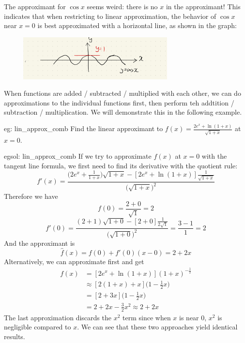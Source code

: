 \begin{remark}
    The approximant for $\cos x$ seems weird: there is no $x$ in the approximant!  This indicates that when restricting to linear approximation, the behavior of $\cos x$ near $x=0$ is best approximated with a horizontal line, as shown in the graph:
\end{remark}

\begin{figure}[ht]
    \centering
    \includegraphics[width = 0.7\textwidth]{figures/chap 05/lin_approx_cos.png}
    \label{fig: lin_approx_cos}
\end{figure}

When functions are added / subtracted / multiplied with each other, we can do approximations to the individual functions first, then perform teh addtition / subtraction / multiplication.  We will demonstrate this in the following example.

\begin{eg}[]{eg: lin_approx_comb}
    Find the linear approximant to $f(x) = \frac{2e^x + \ln(1+x)}{\sqrt{1+x}}$ at $x = 0$.
\end{eg}

\begin{egsol}[]{egsol: lin_approx_comb}
    If we try to approximate $f(x)$ at $x=0$ with the tangent line formula, we first need to find its derivative with the quotient rule:
    \[f'(x) = \frac{\big(2e^x + \frac{1}{1+x}\big)\sqrt{1+x} - [2e^x + \ln(1+x)]\frac{1}{\sqrt{1+x}}}{\big(\sqrt{1+x}\big)^2}\]
    Therefore we have
    \[f(0) = \frac{2+0}{\sqrt{1}} = 2\]
    \[f'(0) = \frac{(2+1)\sqrt{1+0}-[2+0]\frac{1}{2\sqrt{1}}}{\big(\sqrt{1+0}\big)^2} = \frac{3-1}{1} = 2\]
    And the approximant is 
    \[\hat{f}(x) = f(0) + f'(0)(x-0) = 2+2x\]
    Alternatively, we can approximate first and get
    \begin{align*}
        f(x) &= [2e^x + \ln(1+x)](1+x)^{-\frac{1}{2}}\\
        &\approx [2(1+x) + x]\Big(1-\frac{1}{2}x\Big)\\
        &=[2+3x]\Big(1-\frac{1}{2}x\Big)\\
        &=2+2x-\frac{3}{2}x^2 \approx 2+2x
    \end{align*}
    The last approximation discards the $x^2$ term since when $x$ is near $0$, $x^2$ is negligible compared to $x$.  We can see that these two approaches yield identical results.
\end{egsol}

